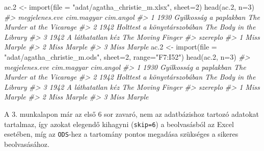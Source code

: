 \documentclass[
]{book}
\newenvironment{Shaded}{\begin{snugshade}}{\end{snugshade}}
\newcommand{\AttributeTok}[1]{\textcolor[rgb]{0.77,0.63,0.00}{#1}}
\newcommand{\CommentTok}[1]{\textcolor[rgb]{0.56,0.35,0.01}{\textit{#1}}}
\newcommand{\DecValTok}[1]{\textcolor[rgb]{0.00,0.00,0.81}{#1}}
\newcommand{\FloatTok}[1]{\textcolor[rgb]{0.00,0.00,0.81}{#1}}
\newcommand{\FunctionTok}[1]{\textcolor[rgb]{0.00,0.00,0.00}{#1}}
\newcommand{\NormalTok}[1]{#1}
\newcommand{\OtherTok}[1]{\textcolor[rgb]{0.56,0.35,0.01}{#1}}
\newcommand{\StringTok}[1]{\textcolor[rgb]{0.31,0.60,0.02}{#1}}
\begin{document}
\begin{Shaded}
\begin{Highlighting}[]
\NormalTok{ac}\FloatTok{.2} \OtherTok{\textless{}{-}} \FunctionTok{import}\NormalTok{(}\AttributeTok{file =} \StringTok{"adat/agatha\_christie\_m.xlsx"}\NormalTok{, }\AttributeTok{sheet=}\DecValTok{2}\NormalTok{)}
\FunctionTok{head}\NormalTok{(ac}\FloatTok{.2}\NormalTok{, }\AttributeTok{n=}\DecValTok{3}\NormalTok{)}
\CommentTok{\#\textgreater{}   megjelenes.eve                  cim.magyar                  cim.angol}
\CommentTok{\#\textgreater{} 1           1930      Gyilkosság a paplakban The Murder at the Vicarage}
\CommentTok{\#\textgreater{} 2           1942 Holttest a könyvtárszobában    The Body in the Library}
\CommentTok{\#\textgreater{} 3           1942           A láthatatlan kéz          The Moving Finger}
\CommentTok{\#\textgreater{}      szereplo}
\CommentTok{\#\textgreater{} 1 Miss Marple}
\CommentTok{\#\textgreater{} 2 Miss Marple}
\CommentTok{\#\textgreater{} 3 Miss Marple}
\NormalTok{ac}\FloatTok{.2} \OtherTok{\textless{}{-}} \FunctionTok{import}\NormalTok{(}\AttributeTok{file =} \StringTok{"adat/agatha\_christie\_m.ods"}\NormalTok{, }\AttributeTok{sheet=}\DecValTok{2}\NormalTok{, }\AttributeTok{range=}\StringTok{"F7:I52"}\NormalTok{)}
\FunctionTok{head}\NormalTok{(ac}\FloatTok{.2}\NormalTok{, }\AttributeTok{n=}\DecValTok{3}\NormalTok{)}
\CommentTok{\#\textgreater{}   megjelenes.eve                  cim.magyar                  cim.angol}
\CommentTok{\#\textgreater{} 1           1930      Gyilkosság a paplakban The Murder at the Vicarage}
\CommentTok{\#\textgreater{} 2           1942 Holttest a könyvtárszobában    The Body in the Library}
\CommentTok{\#\textgreater{} 3           1942           A láthatatlan kéz          The Moving Finger}
\CommentTok{\#\textgreater{}      szereplo}
\CommentTok{\#\textgreater{} 1 Miss Marple}
\CommentTok{\#\textgreater{} 2 Miss Marple}
\CommentTok{\#\textgreater{} 3 Miss Marple}
\end{Highlighting}
\end{Shaded}

A 3. munkalapon már az első 6 sor zavaró, nem az adatbázishoz tartozó adatokat tartalmaz, így azokat elegendő kihagyni (\texttt{skip=6}) a beolvasásból az Excel esetében, míg az \texttt{ODS}-hez a tartomány pontos megadása szükséges a sikeres beolvasásához.
\end{document}
